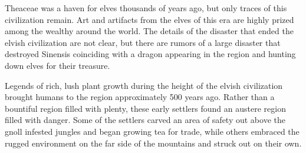 Theaceae was a haven for elves thousands of years ago, but only traces of this civilization remain.
Art and artifacts from the elves of this era are highly prized among the wealthy around the world.
The details of the disaster that ended the elvish civilization are not clear, but there are rumors of a large disaster that destroyed Sinensis coinciding with a dragon appearing in the region and hunting down elves for their treasure.

Legends of rich, lush plant growth during the height of the elvish civilization brought humans to the region approximately 500 years ago.
Rather than a bountiful region filled with plenty, these early settlers found an austere region filled with danger.
Some of the settlers carved an area of safety out above the gnoll infested jungles and began growing tea for trade, while others embraced the rugged environment on the far side of the mountains and struck out on their own.
